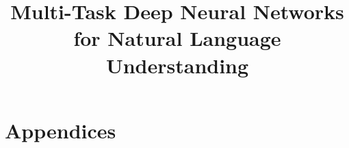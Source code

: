 \documentclass[11pt,a4paper]{article}
\title{Multi-Task Deep Neural Networks for Natural Language Understanding}
\author{Sheng Zhang$^\dagger$\thanks{~~Work done when Sheng Zhang was visiting Microsoft.}, Xiaodong Liu$^\ddagger$, Jingjing Liu$^\ddagger$, Jianfeng Gao$^\ddagger$, \\ 
{\bf Kevin Duh$^\dagger$ \and Benjamin Van Durme$^\dagger$} \\
$^\dagger${Johns Hopkins University}\\
$^\ddagger${Microsoft Research}\\
}
\date{}
\newcommand\MNAME{MT-DNN}
\begin{document}
\onecolumn



\section{Appendices}
\label{sec:appendix}

\end{document}
